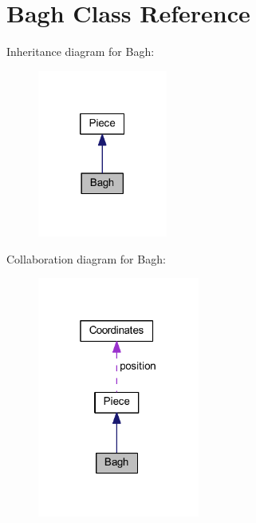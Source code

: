\hypertarget{class_bagh}{}\section{Bagh Class Reference}
\label{class_bagh}


Inheritance diagram for Bagh\+:
\nopagebreak
\begin{figure}[H]
\begin{center}
\leavevmode
\includegraphics[width=121pt]{class_bagh__inherit__graph}
\end{center}
\end{figure}


Collaboration diagram for Bagh\+:
\nopagebreak
\begin{figure}[H]
\begin{center}
\leavevmode
\includegraphics[width=151pt]{class_bagh__coll__graph}
\end{center}
\end{figure}

